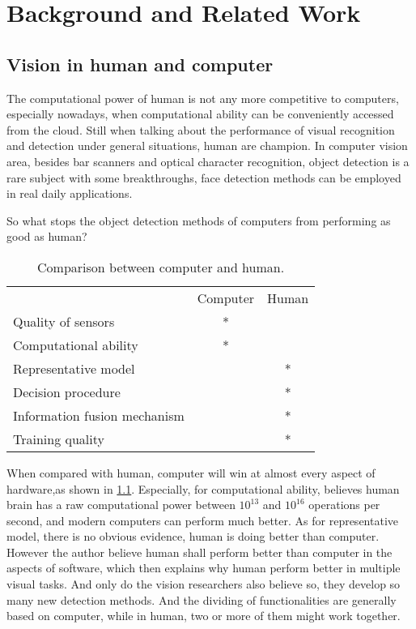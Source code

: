 \chapter{Background and Related Work}

\section{Vision in human and computer}
The computational power of human is not any more competitive to computers, especially nowadays, when computational ability can be conveniently accessed from the cloud.
Still when talking about the performance of visual recognition and detection under general situations, human are champion. In computer vision area, besides bar scanners and optical character recognition, object detection is a rare subject with some breakthroughs, face detection methods can be employed in real daily applications.

So what stops the object detection methods of computers from performing as good as human? 

\begin{table}[h]
\centering
\begin{tabular}{lcc}
     \hline
     \hline
                               &	Computer & Human \\
    Quality of sensors         &	* &   \\
    Computational ability      &	* &	  \\
    Representative model       &	  & * \\
    Decision procedure         &      & *	  \\    
    Information fusion mechanism & & *           \\
    Training quality           &      & *	   \\
   \hline
\end{tabular}
\caption[Power comparison between computer and human]{Comparison between computer and human.}\label{c2tb:tb1}
\end{table}

When compared with human, computer will win at almost every aspect of hardware,as shown in \ref{c2tb:tb1}. Especially, for computational ability, \cite{bpw} believes human brain has a raw computational power between $10^13$ and $10^16$ operations per second, and modern computers can perform much better. As for representative model, there is no obvious evidence, human is doing better than computer. However the author believe human shall perform better than computer in the aspects of software, which then explains why human perform better in multiple visual tasks. And only do the vision researchers also believe so, they develop  so many new detection methods. And the  dividing of functionalities  are generally based on computer, while in human, two or more of them might work together.

